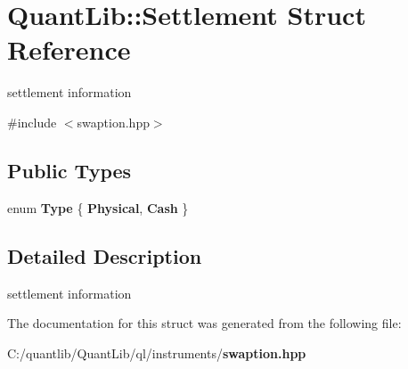 \section{Quant\+Lib\+:\+:Settlement Struct Reference}
\label{struct_quant_lib_1_1_settlement}


settlement information  




{\ttfamily \#include $<$swaption.\+hpp$>$}

\subsection*{Public Types}
\begin{DoxyCompactItemize}
\item 
enum {\bfseries Type} \{ {\bfseries Physical}, 
{\bfseries Cash}
 \}\label{struct_quant_lib_1_1_settlement_ac694d1b4f1bd9a0e0891b45230a83429}

\end{DoxyCompactItemize}


\subsection{Detailed Description}
settlement information 

The documentation for this struct was generated from the following file\+:\begin{DoxyCompactItemize}
\item 
C\+:/quantlib/\+Quant\+Lib/ql/instruments/{\bf swaption.\+hpp}\end{DoxyCompactItemize}
